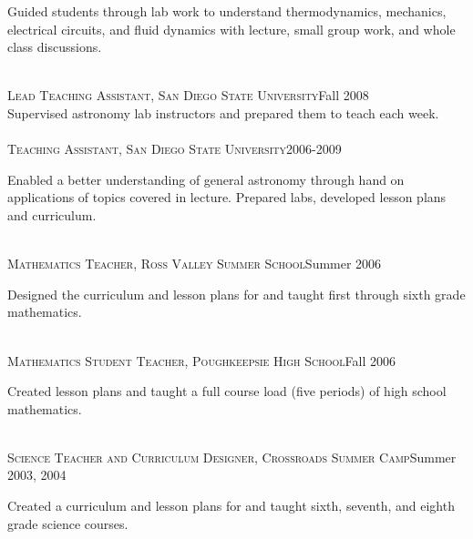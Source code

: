 \documentclass[10pt]{cv}
\begin{document}
\begin{llist}
\begin{minipage}[l]{0.7\textwidth}
Guided students through lab work to understand thermodynamics, mechanics, electrical circuits, and fluid dynamics with lecture, small group work, and whole class discussions.\\
\end{minipage}\vspace{0.15cm}
\\
\textsc{Lead Teaching Assistant, San Diego State University}\hfill Fall 2008\\
Supervised astronomy lab instructors and prepared them to teach each week. \\
\\
\textsc{Teaching Assistant, San Diego State University}\hfill 2006-2009\\
\begin{minipage}[l]{0.7\textwidth}\vspace{0.15cm}
Enabled a better understanding of general astronomy through hand on applications of topics covered in lecture. Prepared labs, developed lesson plans and curriculum.\\
\end{minipage}\vspace{0.15cm}
\\
\textsc{Mathematics Teacher, Ross Valley Summer School}\hfill Summer 2006\\
\begin{minipage}[l]{0.7\textwidth}\vspace{0.15cm}
Designed the curriculum and lesson plans for and taught first through sixth grade mathematics.\\
\end{minipage}\vspace{0.15cm}
\\
\textsc{Mathematics Student Teacher, Poughkeepsie High School}\hfill Fall 2006\\
\begin{minipage}[l]{0.7\textwidth}\vspace{0.15cm}
Created lesson plans and taught a full course load (five periods) of high school mathematics.\\
\end{minipage}\vspace{0.15cm}
\\
\textsc{Science Teacher and Curriculum Designer, Crossroads Summer Camp}\hfill Summer 2003, 2004 \\
\begin{minipage}[l]{0.7\textwidth}\vspace{0.15cm}
Created a curriculum and lesson plans for and taught sixth, seventh, and eighth grade science courses.
\end{minipage}\vspace{0.15cm}
\end{llist}
\newpage
\end{document}
